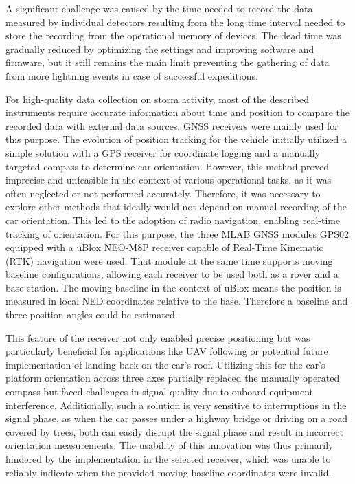 A significant challenge was caused by the time needed to record the data measured by individual detectors resulting from the long time interval needed to store the recording from the operational memory of devices. The dead time was gradually reduced by optimizing the settings and improving software and firmware, but it still remains the main limit preventing the gathering of data from more lightning events in case of successful expeditions.  

For high-quality data collection on storm activity, most of the described instruments require accurate information about time and position to compare the recorded data with external data sources.
GNSS receivers were mainly used for this purpose. The evolution of position tracking for the vehicle initially utilized a simple solution with a GPS receiver for coordinate logging and a manually targeted compass to determine car orientation. However, this method proved imprecise and unfeasible in the context of various operational tasks, as it was often neglected or not performed accurately.
Therefore, it was necessary to explore other methods that ideally would not depend on manual recording of the car orientation. This led to the adoption of radio navigation, enabling real-time tracking of orientation. For this purpose, the three MLAB GNSS modules GPS02 equipped with a uBlox NEO-M8P receiver capable of Real-Time Kinematic (RTK) navigation were used. That module at the same time supports moving baseline configurations, allowing each receiver to be used both as a rover and a base station. The moving baseline in the context of uBlox means the  position is measured in local NED coordinates relative to the base. Therefore a baseline and three position angles could be estimated. 

This feature of the receiver not only enabled precise positioning but was particularly beneficial for applications like UAV following or potential future implementation of landing back on the car's roof. Utilizing this for the car's platform orientation across three axes partially replaced the manually operated compass but faced challenges in signal quality due to onboard equipment interference. Additionally, such a solution is very sensitive to interruptions in the signal phase, as when the car passes under a highway bridge or driving on a road covered by trees, both can easily disrupt the signal phase and result in incorrect orientation measurements. The usability of this innovation was thus primarily hindered by the implementation in the selected receiver, which was unable to reliably indicate when the provided moving baseline coordinates were invalid.

